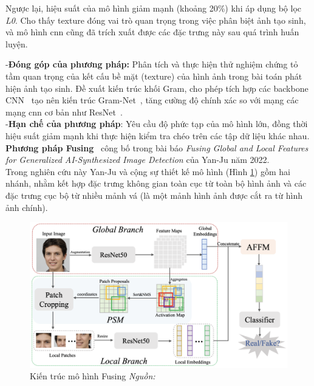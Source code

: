 Ngược lại, hiệu suất của mô hình giảm mạnh (khoảng 20\%) khi áp dụng bộ lọc \textit{L0}. Cho thấy \gls{texture} đóng vai trò quan trọng trong việc phân biệt ảnh tạo sinh, và mô hình \gls{cnn} cũng đã trích xuất được các đặc trưng này sau quá trình huấn luyện.

%
%
-\textbf{Đóng góp của phương pháp:}
Phân tích và thực hiện thử nghiệm chứng tỏ tầm quan trọng của kết cấu bề mặt (\gls{texture}) của hình ảnh trong bài toán phát hiện ảnh tạo sinh.
%
Đề xuất kiến trúc khối Gram, cho phép tích hợp các \gls{backbone} CNN~\cite{Krizhevsky2012ImageNetCW} tạo nên kiến trúc Gram-Net~\cite{9157447}, tăng cường độ chính xác so với mạng các mạng \gls{cnn} cơ bản như ResNet~\cite{He2015DeepRL}.\\
%
-\textbf{Hạn chế của phương pháp}:
Yêu cầu độ phức tạp của mô hình lớn, đồng thời hiệu suất giảm mạnh khi thực hiện kiểm tra chéo trên các tập dữ liệu khác nhau.\\
%
\textbf{Phương pháp Fusing}~\cite{9897820} công bố trong bài báo \textit{Fusing Global and Local Features for Generalized AI-Synthesized Image Detection} của Yan-Ju năm 2022.\\
Trong nghiên cứu này Yan-Ju và cộng sự thiết kế mô hình (Hình \ref{fig:model-fusing-architecture-1}) gồm hai nhánh, nhằm kết hợp đặc trưng không gian toàn cục từ toàn bộ hình ảnh và các đặc trưng cục bộ từ nhiều mảnh vá (là một mảnh hình ảnh được cắt ra từ hình ảnh chính).
%
\begin{figure}[h]
	\centering
	\includegraphics[width=1.0\linewidth]{Images/model-fusing-architecture-1.png}
	\begin{minipage}{0.9\linewidth}
		\caption{Kiến trúc mô hình Fusing \textit{Nguồn: \cite{9897820}}}
		\label{fig:model-fusing-architecture-1}
	\end{minipage}
\end{figure}
%

